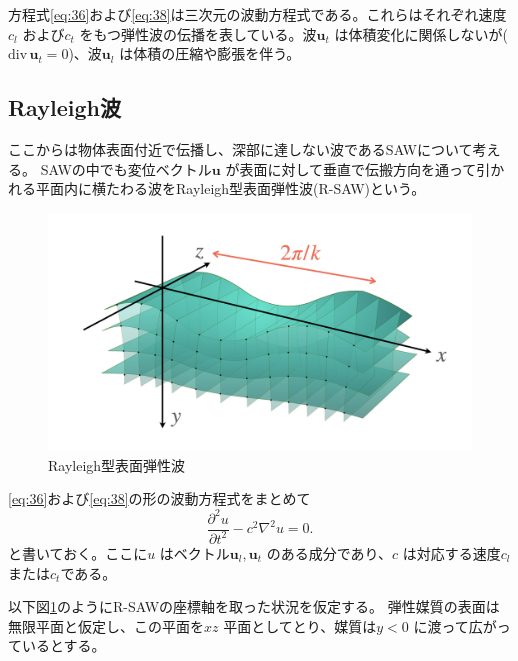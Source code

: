 \documentclass[dvipdfmx,11pt]{jsreport}
\numberwithin{equation}{chapter}
\numberwithin{table}{chapter}
\begin{document}
方程式\eqref{eq:36}および\eqref{eq:38}は三次元の波動方程式である。これらはそれぞれ速度$c_l$ および$c_t$ をもつ弾性波の伝播を表している。波$\bm{u}_t$ は体積変化に関係しないが($\mathrm{div}\,\bm{u}_t=0$)、波$\bm{u}_l$ は体積の圧縮や膨張を伴う。
\subsection{Rayleigh波}\label{ssec2-1-4}
ここからは物体表面付近で伝播し、深部に達しない波であるSAWについて考える。
SAWの中でも変位ベクトル$\bm{u}$ が表面に対して垂直で伝搬方向を通って引かれる平面内に横たわる波をRayleigh型表面弾性波(R-SAW)という。

\begin{figure}[H]
	\centering
	\includegraphics[width=\textwidth]{fig/sawfig.jpeg}
	\caption{Rayleigh型表面弾性波}
	\label{fig:rayleigh}
\end{figure}

\eqref{eq:36}および\eqref{eq:38}の形の波動方程式をまとめて
\begin{equation}
\label{eq:39}
	\frac{\partial ^2u}{\partial t^2} -c^2 \nabla ^2u=0
.\end{equation}
と書いておく。ここに$u$ はベクトル$\bm{u}_l,\bm{u}_t$ のある成分であり、$c$ は対応する速度$c_l$ または$c_t$である。

以下図\ref{fig:rayleigh}のようにR-SAWの座標軸を取った状況を仮定する。
弾性媒質の表面は無限平面と仮定し、この平面を$xz$ 平面としてとり、媒質は$y<0$ に渡って広がっているとする。
\end{document}
